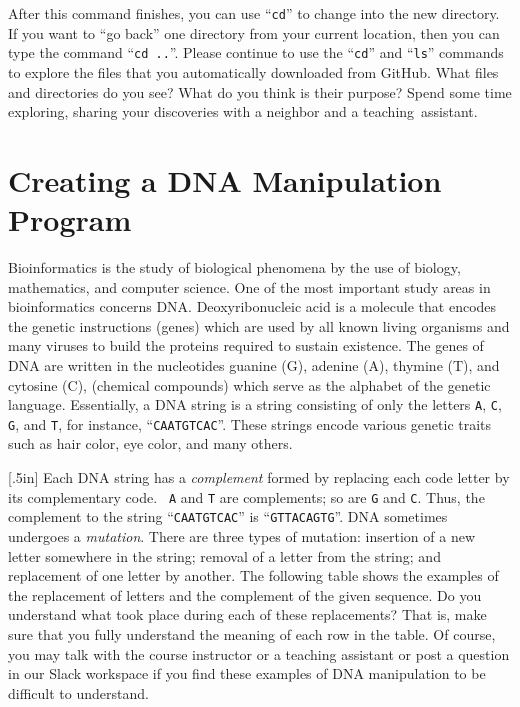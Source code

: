 \documentclass[11pt]{article}
\newcommand{\command}[1]{``\lstinline{#1}''}
\newcommand{\step}[1]{``{#1}''}
\newcommand{\caution}[1]{\null\hfill\LARGE{\faWarning{}}\newline\scriptsize{\em{#1}}}
\begin{document}
After this command finishes, you can use \command{cd} to change into the new
directory. If you want to \step{go back} one directory from your current
location, then you can type the command \command{cd ..}. Please continue to use
the \command{cd} and \command{ls} commands to explore the files that you
automatically downloaded from GitHub. What files and directories do you see?
What do you think is their purpose? Spend some time exploring, sharing your
discoveries with a neighbor and a \mbox{teaching assistant}.

\section*{Creating a DNA Manipulation Program}

Bioinformatics is the study of biological phenomena by the use of biology,
mathematics, and computer science. One of the most important study areas in
bioinformatics concerns DNA. Deoxyribonucleic acid is a molecule that encodes
the genetic instructions (genes) which are used by all known living organisms
and many viruses to build the proteins required to sustain existence. The genes
of DNA are written in the nucleotides guanine (G), adenine (A), thymine (T), and
cytosine (C), (chemical compounds) which serve as the alphabet of the genetic
language.  Essentially, a DNA string is a string consisting of only the letters
{\tt A}, {\tt C}, {\tt G}, and {\tt T}, for instance, ``{\tt CAATGTCAC}''. These
strings encode various genetic traits such as hair color, eye color, and many
others.

\marginnote{\caution{Modify DNA strings}}[.5in] Each DNA string has a {\em
complement} formed by replacing each code letter by its complementary code. {\tt
A} and {\tt T} are complements; so are {\tt G} and {\tt C}. Thus, the complement
to the string ``{\tt CAATGTCAC}'' is ``{\tt GTTACAGTG}''.  DNA sometimes
undergoes a {\em mutation}. There are three types of mutation: insertion of a
new letter somewhere in the string; removal of a letter from the string; and
replacement of one letter by another. The following table shows the examples of
the replacement of letters and the complement of the given sequence. Do you
understand what took place during each of these replacements? That is, make sure
that you fully understand the meaning of each row in the table. Of course, you
may talk with the course instructor or a teaching assistant or post a question
in our Slack workspace if you find these examples of DNA manipulation to be
difficult to understand.
\end{document}
